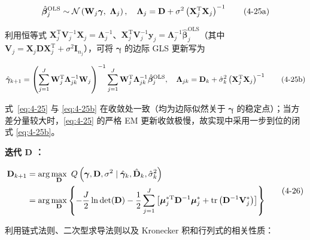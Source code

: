 \documentclass[12pt,a4paper]{ctexart}
\makeatletter
\numberwithin{figure}{section}
\numberwithin{table}{section}
\let\ltx@orig@tag\tag
\renewcommand{\tag}[1]{\refstepcounter{equation}\ltx@orig@tag{#1}}%
\makeatother
\begin{document}
\begin{equation}
\hat{\boldsymbol{\beta}}_{j}^{\mathrm{OLS}}\sim\mathcal{N}\left(\mathbf{W}_{j}\boldsymbol{\gamma},\ \boldsymbol{\Lambda}_{j}\right),\quad \boldsymbol{\Lambda}_{j}=\mathbf{D}+\sigma^{2}\left(\mathbf{X}_{j}^{\mathrm{T}}\mathbf{X}_{j}\right)^{-1} \tag{4-25a}
\end{equation}

利用恒等式 $\mathbf{X}_{j}^{\mathrm{T}}\mathbf{V}_{j}^{-1}\mathbf{X}_{j}=\boldsymbol{\Lambda}_{j}^{-1}$、$\mathbf{X}_{j}^{\mathrm{T}}\mathbf{V}_{j}^{-1}\boldsymbol{y}_{j}=\boldsymbol{\Lambda}_{j}^{-1}\hat{\boldsymbol{\beta}}_{j}^{\mathrm{OLS}}$（其中 $\mathbf{V}_{j}=\mathbf{X}_{j}\mathbf{D}\mathbf{X}_{j}^{\mathrm{T}}+\sigma^{2}\mathbf{I}_{n_{j}}$），可将 $\boldsymbol{\gamma}$ 的边际 GLS 更新写为

\begin{equation}
\hat{\boldsymbol{\gamma}}_{k+1}=\left(\sum_{j=1}^{J}\mathbf{W}_{j}^{\mathrm{T}}\boldsymbol{\Lambda}_{jk}^{-1}\mathbf{W}_{j}\right)^{-1}\sum_{j=1}^{J}\mathbf{W}_{j}^{\mathrm{T}}\boldsymbol{\Lambda}_{jk}^{-1}\hat{\boldsymbol{\beta}}_{j}^{\mathrm{OLS}},\quad \boldsymbol{\Lambda}_{jk}=\mathbf{D}_{k}+\hat{\sigma}_{k}^{2}\left(\mathbf{X}_{j}^{\mathrm{T}}\mathbf{X}_{j}\right)^{-1} \tag{4-25b}\label{eq:4-25b}
\end{equation}

式~\eqref{eq:4-25} 与 \eqref{eq:4-25b} 在收敛处一致（均为边际似然关于 $\boldsymbol{\gamma}$ 的稳定点）；当方差分量较大时，\eqref{eq:4-25} 的严格 EM 更新收敛极慢，故实现中采用一步到位的闭式 \eqref{eq:4-25b}。

\textbf{迭代 $\mathbf{D}$ ：}

\begin{equation}
\begin{aligned}
\mathbf{D}_{k+1}&=\arg\max_{\mathbf{D}}\ Q\left(\boldsymbol{\gamma},\mathbf{D},\sigma^{2}\mid\hat{\boldsymbol{\gamma}}_{k},\hat{\mathbf{D}}_{k},\hat{\sigma}_{k}^{2}\right)\\
&=\arg\max_{\mathbf{D}}\left\{-\frac{J}{2}\ln\det(\mathbf{D})-\frac{1}{2}\sum_{j=1}^{J}\left[\boldsymbol{\mu}_{j}^{*\mathrm{T}}\mathbf{D}^{-1}\boldsymbol{\mu}_{j}^{*}+\operatorname{tr}\left(\mathbf{D}^{-1}\mathbf{V}_{j}^{*}\right)\right]\right\}
\end{aligned} \tag{4-26}
\end{equation}

利用链式法则、二次型求导法则以及 Kronecker 积和行列式的相关性质：
\end{document}
